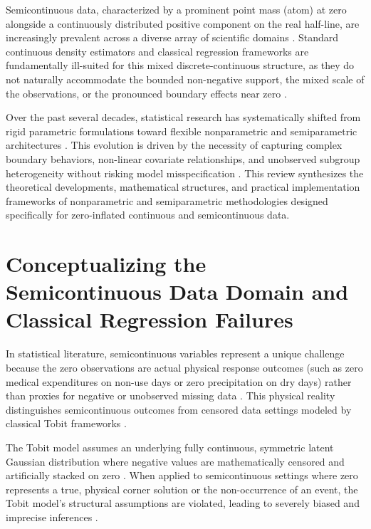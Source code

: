 Semicontinuous data, characterized by a prominent point mass (atom) at zero alongside a continuously distributed positive component on the real half-line, are increasingly prevalent across a diverse array of scientific domains \cite{tweedie_kde, olsen2001}. Standard continuous density estimators and classical regression frameworks are fundamentally ill-suited for this mixed discrete-continuous structure, as they do not naturally accommodate the bounded non-negative support, the mixed scale of the observations, or the pronounced boundary effects near zero \cite{tweedie_kde, boundary_correction}. 

Over the past several decades, statistical research has systematically shifted from rigid parametric formulations toward flexible nonparametric and semiparametric architectures \cite{tweedie_kde, neelon2010}. This evolution is driven by the necessity of capturing complex boundary behaviors, non-linear covariate relationships, and unobserved subgroup heterogeneity without risking model misspecification \cite{subgroup_bnp, zou2025sdnn}. This review synthesizes the theoretical developments, mathematical structures, and practical implementation frameworks of nonparametric and semiparametric methodologies designed specifically for zero-inflated continuous and semicontinuous data.

\section{Conceptualizing the Semicontinuous Data Domain and Classical Regression Failures}

In statistical literature, semicontinuous variables represent a unique challenge because the zero observations are actual physical response outcomes (such as zero medical expenditures on non-use days or zero precipitation on dry days) rather than proxies for negative or unobserved missing data \cite{neelon2010}. This physical reality distinguishes semicontinuous outcomes from censored data settings modeled by classical Tobit frameworks \cite{tobit1958, manning2001}. 

The Tobit model assumes an underlying fully continuous, symmetric latent Gaussian distribution where negative values are mathematically censored and artificially stacked on zero \cite{tobit1958, manning2001}. When applied to semicontinuous settings where zero represents a true, physical corner solution or the non-occurrence of an event, the Tobit model's structural assumptions are violated, leading to severely biased and imprecise inferences \cite{tobit1958, min2005}.

